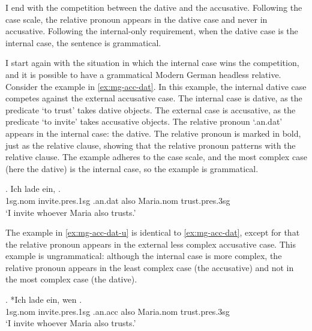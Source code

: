 I end with the competition between the dative and the accusative. Following the case scale, the relative pronoun appears in the dative case and never in accusative. Following the internal-only requirement, when the dative case is the internal case, the sentence is grammatical.

I start again with the situation in which the internal case wins the competition, and it is possible to have a grammatical Modern German headless relative.
Consider the example in \ref{ex:mg-acc-dat}. In this example, the internal dative case competes against the external accusative case.
The internal case is dative, as the predicate  `to trust' takes dative objects.
The external case is accusative, as the predicate  `to invite' takes accusative objects.
The relative pronoun  `.\ac{an}.\ac{dat}' appears in the internal case: the dative. The relative pronoun is marked in bold, just as the relative clause, showing that the relative pronoun patterns with the relative clause.
The example adheres to the case scale, and the most complex case (here the dative) is the internal case, so the example is grammatical.

\exg. Ich {lade ein},    . \\
1\ac{sg}.\ac{nom} invite.\ac{pres}.1\ac{sg}\scsub{[acc]} .\ac{an}.\ac{dat} also Maria.\ac{nom} trust.\ac{pres}.3\ac{sg}\scsub{[dat]}\\
`I invite whoever Maria also trusts.' \label{ex:mg-acc-dat}

The example in \ref{ex:mg-acc-dat-u} is identical to \ref{ex:mg-acc-dat}, except for that the relative pronoun appears in the external less complex accusative case. This example is ungrammatical: although the internal case is more complex, the relative pronoun appears in the least complex case (the accusative) and not in the most complex case (the dative).

\exg. *Ich {lade ein}, wen   . \\
1\ac{sg}.\ac{nom} invite.\ac{pres}.1\ac{sg}\scsub{[acc]} .\ac{an}.\ac{acc} also Maria.\ac{nom} trust.\ac{pres}.3\ac{sg}\scsub{[dat]}\\
`I invite whoever Maria also trusts.' \label{ex:mg-acc-dat-u}

